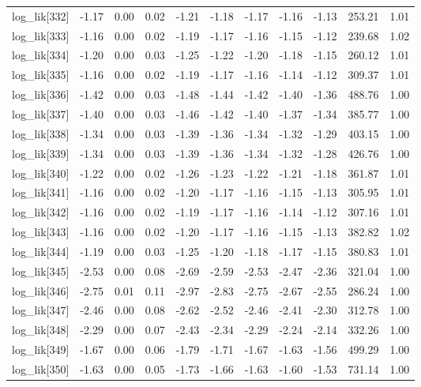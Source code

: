 \begin{table}[ht]
\begin{tabular}{rrrrrrrrrrr}
  log\_lik[332] & -1.17 & 0.00 & 0.02 & -1.21 & -1.18 & -1.17 & -1.16 & -1.13 & 253.21 & 1.01 \\ 
  log\_lik[333] & -1.16 & 0.00 & 0.02 & -1.19 & -1.17 & -1.16 & -1.15 & -1.12 & 239.68 & 1.02 \\ 
  log\_lik[334] & -1.20 & 0.00 & 0.03 & -1.25 & -1.22 & -1.20 & -1.18 & -1.15 & 260.12 & 1.01 \\ 
  log\_lik[335] & -1.16 & 0.00 & 0.02 & -1.19 & -1.17 & -1.16 & -1.14 & -1.12 & 309.37 & 1.01 \\ 
  log\_lik[336] & -1.42 & 0.00 & 0.03 & -1.48 & -1.44 & -1.42 & -1.40 & -1.36 & 488.76 & 1.00 \\ 
  log\_lik[337] & -1.40 & 0.00 & 0.03 & -1.46 & -1.42 & -1.40 & -1.37 & -1.34 & 385.77 & 1.00 \\ 
  log\_lik[338] & -1.34 & 0.00 & 0.03 & -1.39 & -1.36 & -1.34 & -1.32 & -1.29 & 403.15 & 1.00 \\ 
  log\_lik[339] & -1.34 & 0.00 & 0.03 & -1.39 & -1.36 & -1.34 & -1.32 & -1.28 & 426.76 & 1.00 \\ 
  log\_lik[340] & -1.22 & 0.00 & 0.02 & -1.26 & -1.23 & -1.22 & -1.21 & -1.18 & 361.87 & 1.01 \\ 
  log\_lik[341] & -1.16 & 0.00 & 0.02 & -1.20 & -1.17 & -1.16 & -1.15 & -1.13 & 305.95 & 1.01 \\ 
  log\_lik[342] & -1.16 & 0.00 & 0.02 & -1.19 & -1.17 & -1.16 & -1.14 & -1.12 & 307.16 & 1.01 \\ 
  log\_lik[343] & -1.16 & 0.00 & 0.02 & -1.20 & -1.17 & -1.16 & -1.15 & -1.13 & 382.82 & 1.02 \\ 
  log\_lik[344] & -1.19 & 0.00 & 0.03 & -1.25 & -1.20 & -1.18 & -1.17 & -1.15 & 380.83 & 1.01 \\ 
  log\_lik[345] & -2.53 & 0.00 & 0.08 & -2.69 & -2.59 & -2.53 & -2.47 & -2.36 & 321.04 & 1.00 \\ 
  log\_lik[346] & -2.75 & 0.01 & 0.11 & -2.97 & -2.83 & -2.75 & -2.67 & -2.55 & 286.24 & 1.00 \\ 
  log\_lik[347] & -2.46 & 0.00 & 0.08 & -2.62 & -2.52 & -2.46 & -2.41 & -2.30 & 312.78 & 1.00 \\ 
  log\_lik[348] & -2.29 & 0.00 & 0.07 & -2.43 & -2.34 & -2.29 & -2.24 & -2.14 & 332.26 & 1.00 \\ 
  log\_lik[349] & -1.67 & 0.00 & 0.06 & -1.79 & -1.71 & -1.67 & -1.63 & -1.56 & 499.29 & 1.00 \\ 
  log\_lik[350] & -1.63 & 0.00 & 0.05 & -1.73 & -1.66 & -1.63 & -1.60 & -1.53 & 731.14 & 1.00 \\ 

\end{tabular}
\end{table}
